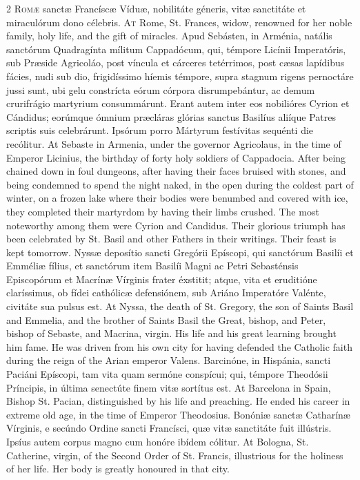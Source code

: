 \begin{paracol}{2}
\lettrine[lines=2]{R}{omæ} sanctæ Francíscæ Víduæ, nobilitáte géneris, 
 vitæ sanctitáte et miraculórum dono célebris.
\switchcolumn
{}
\lettrine[lines=2]{A}{t} Rome, St. Frances, widow, renowned for her noble family, holy life, and 
 the gift of miracles.
\switchcolumn*
{}
Apud Sebásten, in Arménia, natális sanctórum Quadragínta mílitum Cappadócum, 
 qui, témpore Licínii Imperatóris, sub Præside 
 Agricoláo, post víncula et cárceres tetérrimos, post cæsas lapídibus fácies, 
 nudi sub dio, frigidíssimo híemis témpore, supra stagnum rigens pernoctáre 
 jussi sunt, ubi gelu constrícta eórum córpora disrumpebántur, ac demum 
 crurifrágio martyrium consummárunt. Erant autem inter eos nobilióres 
 Cyrion et Cándidus; eorúmque ómnium præcláras glórias sanctus Basilíus 
 aliíque Patres scriptis suis celebrárunt. Ipsórum porro Mártyrum 
 festívitas sequénti die recólitur.
\switchcolumn
{}
At Sebaste in Armenia, under the governor Agricolaus, in the time of Emperor 
 Licinius, the birthday of forty holy soldiers of Cappadocia. After 
 being chained down in foul dungeons, after having their faces bruised with 
 stones, and being condemned to spend the night naked, in the open during the 
 coldest part of winter, on a frozen lake where their bodies were benumbed 
 and covered with ice, they completed their martyrdom by having their limbs 
 crushed. The most noteworthy among them were Cyrion and Candidus. 
 Their glorious triumph has been celebrated by St. Basil and other Fathers in 
 their writings. Their feast is kept tomorrow.
\switchcolumn*
{}
Nyssæ deposítio sancti Gregórii Epíscopi, qui 
 sanctórum Basilíi et Emméliæ fílius, et sanctórum item Basilíi Magni ac 
 Petri Sebasténsis Episcopórum et Macrínæ Vírginis frater éxstitit; atque, 
 vita et eruditióne claríssimus, ob fídei cathólicæ defensiónem, sub Ariáno 
 Imperatóre Valénte, civitáte sua pulsus est.
\switchcolumn
{}
At Nyssa, the death of St. Gregory, the son of Saints Basil and Emmelia, and 
 the brother of Saints Basil the Great, bishop, and Peter, bishop of Sebaste, 
 and Macrina, virgin. His life and his great learning brought him fame. 
 He was driven from his own city for having defended the Catholic faith 
 during the reign of the Arian emperor Valens.
\switchcolumn*
{}
Barcinóne, in Hispánia, sancti Paciáni Epíscopi, tam vita quam sermóne 
 conspícui; qui, témpore Theodósii Príncipis, in 
 última senectúte finem vitæ 
 sortítus est.
\switchcolumn
{}
At Barcelona in Spain, Bishop St. Pacian, distinguished by his life and 
 preaching. He ended his career in extreme old age, in the time of 
 Emperor Theodosius.
\switchcolumn*
{}
Bonóniæ sanctæ Catharínæ Vírginis, e secúndo 
 Ordine sancti Francísci, quæ vitæ sanctitáte fuit illústris. Ipsíus 
 autem corpus magno cum honóre ibídem cólitur.
\switchcolumn
{}
At Bologna, St. Catherine, virgin, of the Second Order of St. Francis, 
 illustrious for the holiness of her life. Her body is greatly honoured 
 in that city.
\switchcolumn*
{}
\end{paracol}


